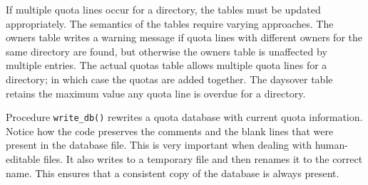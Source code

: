 If multiple quota lines occur for a directory, the tables must be
updated appropriately. The semantics of the tables require varying
approaches. The owners table writes a warning message if quota lines
with different owners for the same directory are found, but otherwise
the owners table is unaffected by multiple entries. The actual quotas
table allows multiple quota lines for a directory; in which case the
quotas are added together. The daysover table retains the maximum value
any quota line is overdue for a directory. 


Procedure \texttt{write\_db()} rewrites a quota database with current
quota information. Notice how the code preserves the
comments and the blank lines that were present in the
database file. This is very important when dealing with human-editable
files. It also writes to a temporary file and then renames it to the
correct name. This ensures that a consistent copy of the database is
always present.

